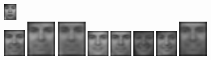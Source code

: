 \begin{figure}[hbt]
  \includegraphics[width=0.06\textwidth]{../results/L_rez/correct90/1/10.jpg} \\
  \vspace{4pt}
  \includegraphics[width=0.1\textwidth]{../results/L_rez/correct90/2/testImg.jpg} \vline
  \hspace{2pt}
  \includegraphics[width=42pt]{../results/L_rez/correct90/2/1.jpg}
  \includegraphics[width=42pt]{../results/L_rez/correct90/2/2.jpg}
  \includegraphics[width=31pt]{../results/L_rez/correct90/2/3.jpg}
  \includegraphics[width=31pt]{../results/L_rez/correct90/2/4.jpg}
  \includegraphics[width=31pt]{../results/L_rez/correct90/2/5.jpg}
  \includegraphics[width=31pt]{../results/L_rez/correct90/2/6.jpg}
  \includegraphics[width=42pt]{../results/L_rez/correct90/2/7.jpg}

\end{figure}

